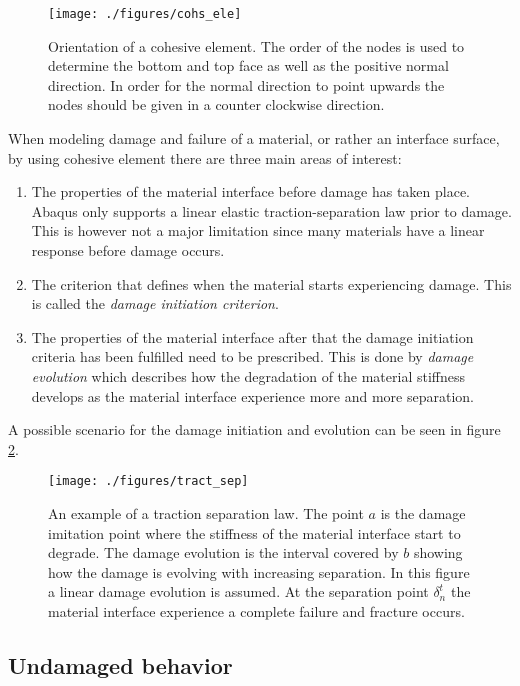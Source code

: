 \documentclass[grain_boundary_law.tex]{subfiles}
\begin{document}
\begin{figure}[htpb!]
\centering
 \texttt{[image: ./figures/cohs\_ele]}
\caption{Orientation of a cohesive element. The order of the nodes is used to determine the bottom and top face as well as the positive normal direction. In order for the normal direction to point upwards the nodes should be given in a counter clockwise direction.}
\label{fig:cohs_ori}
\end{figure}


When modeling damage and failure of a material, or rather an interface surface, by using cohesive element there are three main areas of interest:

\begin{enumerate}
\item The properties of the material interface before damage has taken place. Abaqus only supports a linear elastic traction-separation law prior to damage. This is however not a major limitation since many materials have a linear response before damage occurs. 

\item The criterion that defines when the material starts experiencing damage. This is called the \textit{damage initiation criterion}.

\item The properties of the material interface after that the damage initiation criteria has been fulfilled need to be prescribed. This is done by \textit{damage evolution} which describes how the degradation of the material stiffness develops as the material interface experience more and more separation.
\end{enumerate}
%
A possible scenario for the damage initiation and evolution can be seen in figure \ref{fig:tract_sep}.

\begin{figure}[htpb!]
\centering
  \texttt{[image: ./figures/tract\_sep]}
\caption{An example of a traction separation law. The point $a$ is the damage imitation point where the stiffness of the material interface start to degrade. The damage evolution is the interval covered by $b$ showing how the damage is evolving with increasing separation. In this figure a linear damage evolution is assumed. At the separation point $\delta_n^t$ the material interface experience a complete failure and fracture occurs.}
\label{fig:tract_sep}
\end{figure}

\subsection{Undamaged behavior}
 
\end{document}
